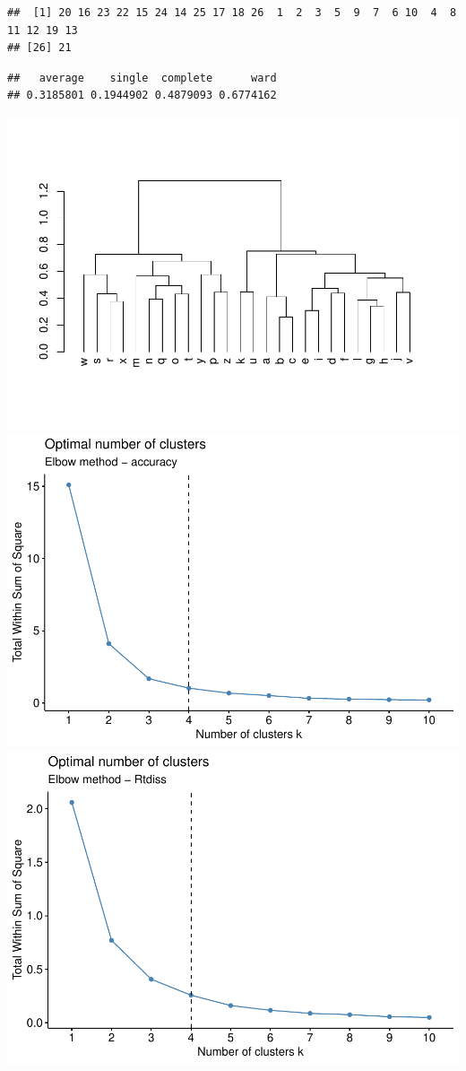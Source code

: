 \documentclass[english,man]{apa7}
\begin{document}
\begin{verbatim}
##  [1] 20 16 23 22 15 24 14 25 17 18 26  1  2  3  5  9  7  6 10  4  8 11 12 19 13
## [26] 21
\end{verbatim}

\begin{verbatim}
##   average    single  complete      ward 
## 0.3185801 0.1944902 0.4879093 0.6774162
\end{verbatim}

\includegraphics{BF_ms_1_files/figure-latex/Hierarchical clustering sighted-2.pdf} \includegraphics{BF_ms_1_files/figure-latex/Hierarchical clustering sighted-3.pdf} \includegraphics{BF_ms_1_files/figure-latex/Hierarchical clustering sighted-4.pdf}
\end{document}
